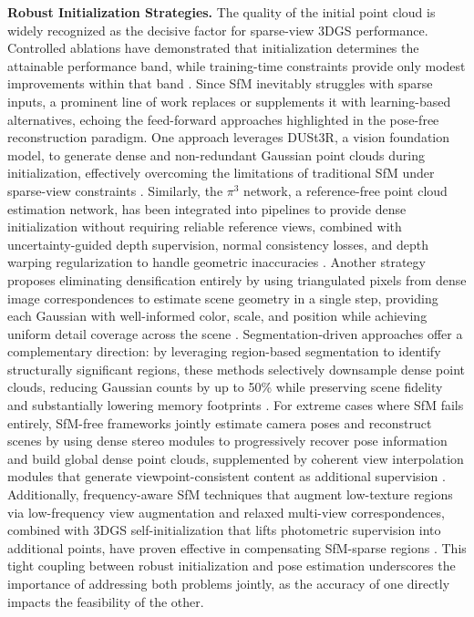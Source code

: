 \documentclass[11pt]{article}
\begin{document}
\textbf{Robust Initialization Strategies.} The quality of the initial point cloud is widely recognized as the decisive factor for sparse-view 3DGS performance. Controlled ablations have demonstrated that initialization determines the attainable performance band, while training-time constraints provide only modest improvements within that band \cite{ref137}. Since SfM inevitably struggles with sparse inputs, a prominent line of work replaces or supplements it with learning-based alternatives, echoing the feed-forward approaches highlighted in the pose-free reconstruction paradigm. One approach leverages DUSt3R, a vision foundation model, to generate dense and non-redundant Gaussian point clouds during initialization, effectively overcoming the limitations of traditional SfM under sparse-view constraints \cite{ref256}. Similarly, the \(\pi\)\(^3\) network, a reference-free point cloud estimation network, has been integrated into pipelines to provide dense initialization without requiring reliable reference views, combined with uncertainty-guided depth supervision, normal consistency losses, and depth warping regularization to handle geometric inaccuracies \cite{ref259}. Another strategy proposes eliminating densification entirely by using triangulated pixels from dense image correspondences to estimate scene geometry in a single step, providing each Gaussian with well-informed color, scale, and position while achieving uniform detail coverage across the scene \cite{ref138}. Segmentation-driven approaches offer a complementary direction: by leveraging region-based segmentation to identify structurally significant regions, these methods selectively downsample dense point clouds, reducing Gaussian counts by up to 50\% while preserving scene fidelity and substantially lowering memory footprints \cite{ref260}. For extreme cases where SfM fails entirely, SfM-free frameworks jointly estimate camera poses and reconstruct scenes by using dense stereo modules to progressively recover pose information and build global dense point clouds, supplemented by coherent view interpolation modules that generate viewpoint-consistent content as additional supervision \cite{ref261}. Additionally, frequency-aware SfM techniques that augment low-texture regions via low-frequency view augmentation and relaxed multi-view correspondences, combined with 3DGS self-initialization that lifts photometric supervision into additional points, have proven effective in compensating SfM-sparse regions \cite{ref137}. This tight coupling between robust initialization and pose estimation underscores the importance of addressing both problems jointly, as the accuracy of one directly impacts the feasibility of the other.
\end{document}
